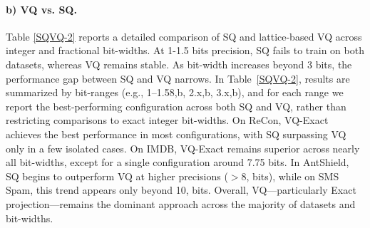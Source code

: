 \documentclass{article}
\theoremstyle{definition}
\theoremstyle{remark}
\begin{document}

\paragraph{b) VQ vs. SQ.}
Table \ref{SQVQ-2} reports a detailed comparison of SQ and lattice-based VQ across integer and fractional bit-widths. At 1-1.5 bits precision, SQ fails to train on both datasets, whereas VQ remains stable. 
As bit-width increases beyond 3 bits, the performance gap between SQ and VQ narrows. In Table~\ref{SQVQ-2}, results are summarized by bit-ranges (e.g., 1–1.58,b, 2.x,b, 3.x,b), and for each range we report the best-performing configuration across both SQ and VQ, rather than restricting comparisons to exact integer bit-widths. On ReCon, VQ-Exact achieves the best performance in most configurations, with SQ surpassing VQ only in a few isolated cases. On IMDB, VQ-Exact remains superior across nearly all bit-widths, except for a single configuration around 7.75 bits. In AntShield, SQ begins to outperform VQ at higher precisions ($>8$, bits), while on SMS Spam, this trend appears only beyond 10, bits. Overall, VQ—particularly Exact projection—remains the dominant approach across the majority of datasets and bit-widths.
\end{document}
